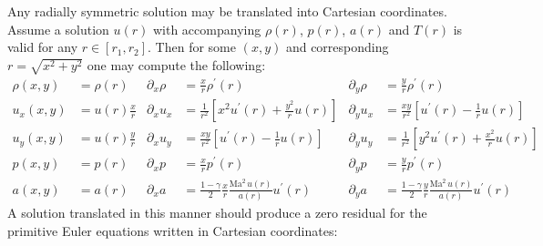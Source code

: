 \documentclass[letterpaper,11pt,nointlimits,reqno]{amsart}
\newcommand{\Mach}[1][]{\mbox{Ma}_{#1}}
\begin{document}
Any radially symmetric solution may be translated into Cartesian coordinates.
Assume a solution $u\!\left(r\right)$ with accompanying $\rho\!\left(r\right)$,
$p\!\left(r\right)$, $a\!\left(r\right)$ and $T\!\left(r\right)$ is valid for
any $r\in\left[r_1,r_2\right]$.  Then for some $\left(x,y\right)$ and
corresponding $r=\sqrt{x^2+y^2}$ one may compute the following:
%
\begin{align}
              \rho \!\left(x, y\right) &= \rho\!\left(r\right)
 & \partial_x \rho                     &= \frac{x}{r} \rho^\prime\!\left(r\right)
 & \partial_y \rho                     &= \frac{y}{r} \rho^\prime\!\left(r\right)
\\            u_x  \!\left(x, y\right) &= u   \!\left(r\right) \frac{x}{r}
 & \partial_x u_x                      &= \frac{1}{r^2}\left[x^2 u^\prime\!\left(r\right) + \frac{y^2}{r} u\!\left(r\right)\right]
 & \partial_y u_x                      &= \frac{xy}{r^2}\left[u^\prime\!\left(r\right) - \frac{1}{r}u\!\left(r\right)\right]
\\            u_y  \!\left(x, y\right) &= u   \!\left(r\right) \frac{y}{r}
 & \partial_x u_y                      &= \frac{xy}{r^2}\left[u^\prime\!\left(r\right) - \frac{1}{r}u\!\left(r\right)\right]
 & \partial_y u_y                      &= \frac{1}{r^2}\left[y^2 u^\prime\!\left(r\right) + \frac{x^2}{r} u\!\left(r\right)\right]
\\            p    \!\left(x, y\right) &=  p   \!\left(r\right)
 & \partial_x p                        &= \frac{x}{r} p^\prime\!\left(r\right)
 & \partial_y p                        &= \frac{y}{r} p^\prime\!\left(r\right)
\\            a    \!\left(x, y\right) &=  a   \!\left(r\right)
 & \partial_x a                        &= \frac{1-\gamma}{2}\frac{x}{r}\frac{\Mach^2\,u\!\left(r\right)}{a\!\left(r\right)} u^\prime\!\left(r\right)
 & \partial_y a                        &= \frac{1-\gamma}{2}\frac{y}{r}\frac{\Mach^2\,u\!\left(r\right)}{a\!\left(r\right)} u^\prime\!\left(r\right)
\end{align}
%
A solution translated in this manner should produce a zero residual for the
primitive Euler equations written in Cartesian coordinates:
%
\end{document}
